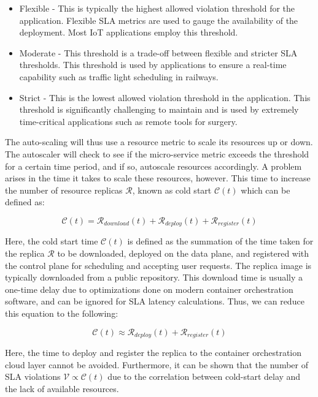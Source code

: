 \begin{itemize}
    \item Flexible - This is typically the highest allowed violation threshold for the application. Flexible SLA metrics are used to gauge the availability of the deployment. Most IoT applications employ this threshold.
    \item Moderate - This threshold is a trade-off between flexible and stricter SLA thresholds. This threshold is used by applications to ensure a real-time capability such as traffic light scheduling in railways.
    \item Strict - This is the lowest allowed violation threshold in the application. This threshold is significantly challenging to maintain and is used by extremely time-critical applications such as remote tools for surgery.
\end{itemize}

The auto-scaling will thus use a resource metric to scale its resources up or down. The autoscaler will check to see if the micro-service metric exceeds the threshold for a certain time period, and if so, autoscale resources accordingly. A problem arises in the time it takes to scale these resources, however. This time to increase the number of resource replicas $\mathcal{R}$, known as cold start $\mathcal{C}(t)$ which can be defined as:

\begin{equation}
    \mathcal{C}(t) = \mathcal{R}_{download}(t) + \mathcal{R}_{deploy}(t) + \mathcal{R}_{register}(t)
\end{equation}

Here, the cold start time $\mathcal{C}(t)$ is defined as the summation of the time taken for the replica $\mathcal{R}$ to be downloaded, deployed on the data plane, and registered with the control plane for scheduling and accepting user requests. The replica image is typically downloaded from a public repository. This download time is usually a one-time delay due to optimizations done on modern container orchestration software, and can be ignored for SLA latency calculations. Thus, we can reduce this equation to the following:

\begin{equation}
    \mathcal{C}(t) \approx \mathcal{R}_{deploy}(t) + \mathcal{R}_{register}(t)
\end{equation}


Here, the time to deploy and register the replica to the container orchestration cloud layer cannot be avoided. Furthermore, it can be shown that the number of SLA violations $\mathcal{V} \propto \mathcal{C}(t)$ due to the correlation between cold-start delay and the lack of available resources.\par

